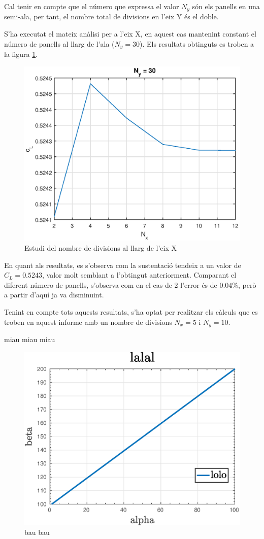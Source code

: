 Cal tenir en compte que el número que expressa el valor $N_{y}$ són els panells en una semi-ala, per tant, el nombre total de divisions en l'eix Y és el doble.

S'ha executat el mateix anàlisi per a l'eix X, en aquest cas mantenint constant el número de panells al llarg de l'ala ($N_{y}=30$). Els resultats obtinguts es troben a la figura \ref{nx}.

\begin{figure}[h]
	\centering
	\includegraphics{./plots/nxcl}
	\caption{Estudi del nombre de divisions al llarg de l'eix X}
	\label{nx}
\end{figure}

En quant als resultats, es s'observa com la sustentació tendeix a un valor de $C_{L}=0.5243$, valor molt semblant a l'obtingut anteriorment. Comparant el diferent número de panells, s'observa com en el cas de 2 l'error és de $0.04\%$, però a partir d'aquí ja va disminuint.

Tenint en compte tots aquests resultats, s'ha optat per realitzar els càlculs que es troben en aquest informe amb un nombre de divisions $N_{x}=5$ i $N_{y}=10$.

\newpage
miau miau miau
\begin{figure}[h]
		\includegraphics[width=\textwidth]{./plots/test}
		\caption{bau bau}
\end{figure}

